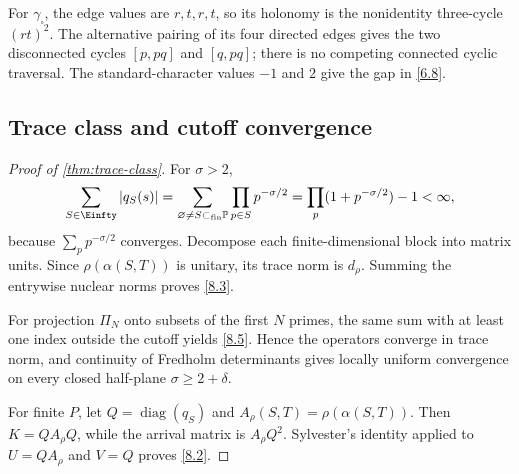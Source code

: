 For $\gamma_\square$, the edge values are $r,t,r,t$, so its holonomy is the
nonidentity three-cycle $(rt)^2$.  The alternative pairing of its four
directed edges gives the two disconnected cycles $[p,pq]$ and $[q,pq]$;
there is no competing connected cyclic traversal.  The standard-character
values $-1$ and $2$ give the gap in \eqref{6.8}.

\subsection{Trace class and cutoff convergence}

\begin{proof}[Proof of \cref{thm:trace-class}]
For $\sigma>2$,
\[
\sum_{S\in\Einfty}|q_S(s)|
=\sum_{\varnothing\ne S\subset_{\mathrm{fin}}\mathbb P}
 \prod_{p\in S}p^{-\sigma/2}
=\prod_p(1+p^{-\sigma/2})-1<\infty,
\]
because $\sum_pp^{-\sigma/2}$ converges.  Decompose each finite-dimensional
block into matrix units.  Since $\rho(\alpha(S,T))$ is unitary, its trace
norm is $d_\rho$.  Summing the entrywise nuclear norms proves \eqref{8.3}.

For projection $\Pi_N$ onto subsets of the first $N$ primes, the same sum
with at least one index outside the cutoff yields \eqref{8.5}.  Hence the
operators converge in trace norm, and continuity of Fredholm determinants
gives locally uniform convergence on every closed half-plane
$\sigma\ge2+\delta$.

For finite $P$, let $Q=\operatorname{diag}(q_S)$ and
$A_\rho(S,T)=\rho(\alpha(S,T))$.  Then $K=QA_\rho Q$, while the arrival
matrix is $A_\rho Q^2$.  Sylvester's identity applied to
$U=QA_\rho$ and $V=Q$ proves \eqref{8.2}.
\end{proof}
